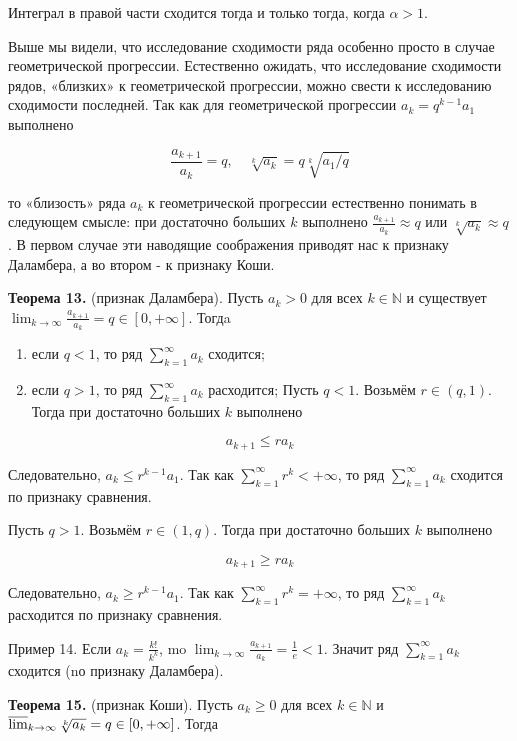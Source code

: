 \documentclass[a4paper,12pt]{article} %
\begin{document}
	Интеграл в правой части сходится тогда и только тогда, когда $\alpha>1$.
	
	Выше мы видели, что исследование сходимости ряда особенно просто в случае геометрической прогрессии. Естественно ожидать, что исследование сходимости рядов, «близких» к геометрической прогрессии, можно свести к исследованию сходимости последней. Так как для геометрической прогрессии $a_{k}=q^{k-1} a_{1}$ выполнено
	
	$$
	\frac{a_{k+1}}{a_{k}}=q, \quad \sqrt[k]{a_{k}}=q \sqrt[k]{a_{1} / q}
	$$
	
	то «близость» ряда $a_{k}$ к геометрической прогрессии естественно понимать в следующем смысле: при достаточно больших $k$ выполнено $\frac{a_{k+1}}{a_{k}} \approx q$ или $\sqrt[k]{a_{k}} \approx q$. В первом случае эти наводящие соображения приводят нас к признаку Даламбера, а во втором - к признаку Коши.
	
	\textbf{Теорема 13.} (признак Даламбера). Пусть $a_{k}>0$ для всех $k \in \mathbb{N}$ и существует $\lim _{k \rightarrow \infty} \frac{a_{k+1}}{a_{k}}=q \in[0,+\infty]$. Тогдa
	
	\begin{enumerate}
		\item если $q<1$, то ряд $\sum_{k=1}^{\infty} a_{k}$ сходится;
	
		\item если $q>1$, то ряд $\sum_{k=1}^{\infty} a_{k}$ расходится; Пусть $q<1$. Возьмём $r \in(q, 1)$. Тогда при достаточно больших $k$ выполнено
	
	\end{enumerate}
	
	$$
	a_{k+1} \leq r a_{k}
	$$
	
	Следовательно, $a_{k} \leq r^{k-1} a_{1}$. Так как $\sum_{k=1}^{\infty} r^{k}<+\infty$, то ряд $\sum_{k=1}^{\infty} a_{k}$ сходится по признаку сравнения.
	
	Пусть $q>1$. Возьмём $r \in(1, q)$. Тогда при достаточно больших $k$ выполнено
	
	$$
	a_{k+1} \geq r a_{k}
	$$
	
	Следовательно, $a_{k} \geq r^{k-1} a_{1}$. Так как $\sum_{k=1}^{\infty} r^{k}=+\infty$, то ряд $\sum_{k=1}^{\infty} a_{k}$ расходится по признаку сравнения.
	
	Пример 14. Если $a_{k}=\frac{k !}{k^{k}}$, mo $\lim _{k \rightarrow \infty} \frac{a_{k+1}}{a_{k}}=\frac{1}{e}<1$. Значит ряд $\sum_{k=1}^{\infty} a_{k}$ сходится (nо признаку Даламбера).
	
	\textbf{Теорема 15.} (признак Коши). Пусть $a_{k} \geq 0$ для всех $k \in \mathbb{N}$ и $\varlimsup_{k \rightarrow \infty} \sqrt[k]{a_{k}}=q \in[0,+\infty]$. Тогда
	
\end{document}
